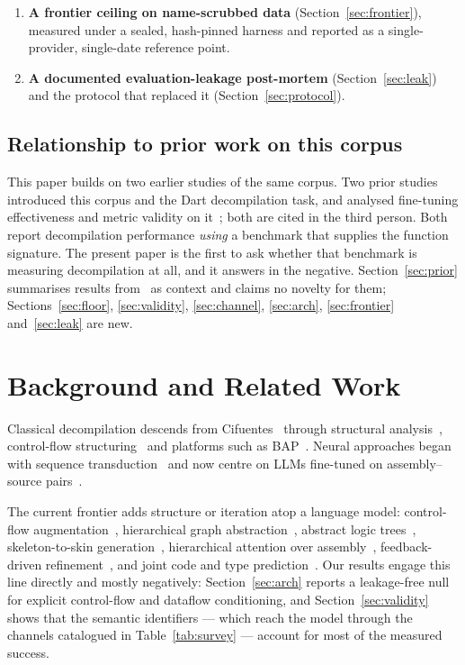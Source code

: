 \documentclass[conference]{IEEEtran}
\begin{document}
\begin{enumerate}[leftmargin=*,topsep=2pt,itemsep=1pt]
(Section~\ref{sec:arch}): sixteen controlled interventions with one significant
effect and a control-flow-edge effect whose sign reverses across seeds, together
with a rejection-sampling programme closed across six checkpoints and three
arrangements.
\item \textbf{A frontier ceiling on name-scrubbed data}
(Section~\ref{sec:frontier}), measured under a sealed, hash-pinned harness and
reported as a single-provider, single-date reference point.
\item \textbf{A documented evaluation-leakage post-mortem}
(Section~\ref{sec:leak}) and the protocol that replaced it
(Section~\ref{sec:protocol}).
\end{enumerate}

\subsection{Relationship to prior work on this corpus}
This paper builds on two earlier studies of the same corpus. Two prior studies introduced this corpus and the Dart decompilation task, and
analysed fine-tuning effectiveness and metric validity on
it~\cite{abualazm2026idiomatic,abualazm2026tosem}; both are cited in the third person. Both report decompilation performance
\emph{using} a benchmark that supplies the function signature. The present paper
is the first to ask whether that benchmark is measuring decompilation at all,
and it answers in the negative. Section~\ref{sec:prior} summarises
results from~\cite{abualazm2026tosem} as context and claims no novelty for them;
Sections~\ref{sec:floor}, \ref{sec:validity}, \ref{sec:channel}, \ref{sec:arch},
\ref{sec:frontier} and~\ref{sec:leak} are new.

\section{Background and Related Work}
Classical decompilation descends from Cifuentes~\cite{cifuentes1994reverse}
through structural analysis~\cite{schwartz2013native}, control-flow
structuring~\cite{yakdan2015no} and platforms such as
BAP~\cite{brumley2011bap}. Neural approaches began with sequence
transduction~\cite{katz2018using,fu2019coda} and now centre on LLMs fine-tuned
on assembly--source pairs~\cite{llm4decompile}.

The current frontier adds structure or iteration atop a language model:
control-flow augmentation~\cite{liu2025cfadecllm}, hierarchical graph
abstraction~\cite{achamyeleh2026helios}, abstract logic
trees~\cite{wang2025salt4decompile}, skeleton-to-skin
generation~\cite{tan2025sk2decompile}, hierarchical attention over
assembly~\cite{jiang2025nova}, feedback-driven
refinement~\cite{liu2026autodecompiler}, and joint code and type
prediction~\cite{dramko2025idioms}. Our results engage this line directly and
mostly negatively: Section~\ref{sec:arch} reports a leakage-free null for
explicit control-flow and dataflow conditioning, and Section~\ref{sec:validity}
shows that the semantic identifiers --- which reach the model through the
channels catalogued in Table~\ref{tab:survey} --- account for most of the
measured success.
\end{document}
